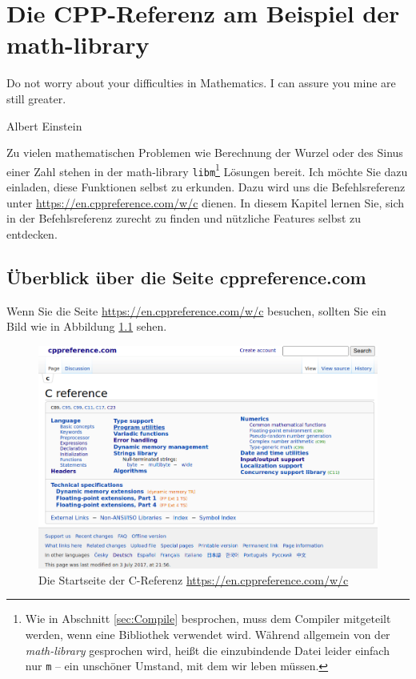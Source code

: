 \chapter{Die CPP-Referenz am Beispiel der math-library}\label{chp:maths}
\epigraph{Do not worry about your difficulties in Mathematics. I can assure you mine are still greater.}{Albert Einstein}

Zu vielen mathematischen Problemen wie Berechnung der Wurzel oder des Sinus einer Zahl stehen in der math-library \texttt{libm}\footnote{Wie in Abschnitt \ref{sec:Compile} besprochen, muss dem Compiler mitgeteilt werden, wenn eine Bibliothek verwendet wird. Während allgemein von der \emph{math-library} gesprochen wird, heißt die einzubindende Datei leider einfach nur \texttt{m} -- ein unschöner Umstand, mit dem wir leben müssen.} Lösungen bereit. Ich möchte Sie dazu einladen, diese Funktionen selbst zu erkunden. Dazu wird uns die Befehlsreferenz unter \url{https://en.cppreference.com/w/c} dienen. In diesem Kapitel lernen Sie, sich in der Befehlsreferenz zurecht zu finden und nützliche Features selbst zu entdecken.

\section{Überblick über die Seite cppreference.com}
Wenn Sie die Seite \url{https://en.cppreference.com/w/c} besuchen, sollten Sie ein Bild wie in Abbildung \ref{fig:cpp-home} sehen.

\begin{figure}[h!]
	\includegraphics[width=\linewidth]{./gfx/cpp-home}
	\caption{Die Startseite der C-Referenz \url{https://en.cppreference.com/w/c}} \label{fig:cpp-home}
\end{figure}

